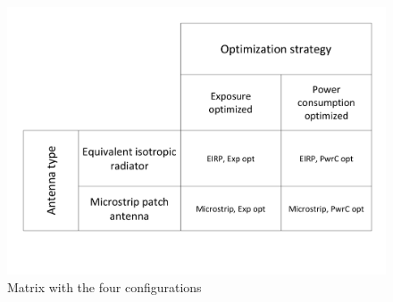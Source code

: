 \begin{figure}[h!]
  \includegraphics[width=\textwidth]{../images/fourCasesMatrix.pdf}
  \caption{Matrix with the four configurations}
  \label{fig:fourCasesMatrix}
\end{figure}

